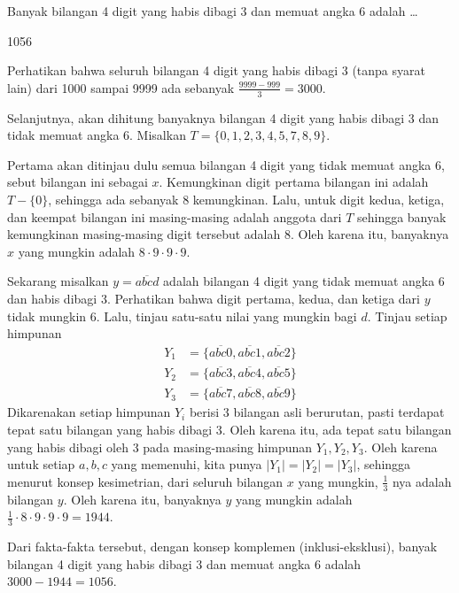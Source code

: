 \begin{soalbaru}
Banyak bilangan 4 digit yang habis dibagi 3 dan memuat angka 6 adalah \dots
\end{soalbaru}
\begin{jawaban}
1056
\end{jawaban}
\begin{solusi}
Perhatikan bahwa seluruh bilangan 4 digit yang habis dibagi 3 (tanpa syarat lain) dari 1000 sampai 9999 ada sebanyak $\frac{9999-999}{3}=3000$. 

Selanjutnya, akan dihitung banyaknya bilangan 4 digit yang habis dibagi 3 dan tidak memuat angka 6. Misalkan $T = \{0,1,2,3,4,5,7,8,9\}$. 

Pertama akan ditinjau dulu semua bilangan 4 digit yang tidak memuat angka 6, sebut bilangan ini sebagai $x$. Kemungkinan digit pertama bilangan ini adalah $T - \{0\}$, sehingga ada sebanyak $8$ kemungkinan. Lalu, untuk digit kedua, ketiga, dan keempat bilangan ini masing-masing adalah anggota dari $T$ sehingga banyak kemungkinan masing-masing digit tersebut adalah 8. Oleh karena itu, banyaknya $x$ yang mungkin adalah $8 \cdot 9 \cdot 9 \cdot 9$.

Sekarang misalkan $y = \overline{abcd}$ adalah bilangan 4 digit yang tidak memuat angka 6 dan habis dibagi 3. Perhatikan bahwa digit pertama, kedua, dan ketiga dari $y$ tidak mungkin 6. Lalu, tinjau satu-satu nilai yang mungkin bagi $d$. Tinjau setiap himpunan 
\begin{align*}
Y_1 &=\{\overline{abc0},\overline{abc1},\overline{abc2}\}\\ 
Y_2 &=\{\overline{abc3},\overline{abc4},\overline{abc5}\}\\
Y_3 &=\{\overline{abc7},\overline{abc8},\overline{abc9}\}
\end{align*}
Dikarenakan setiap himpunan $Y_i$ berisi 3 bilangan asli berurutan, pasti terdapat tepat satu bilangan yang habis dibagi 3. Oleh karena itu, ada tepat satu bilangan yang habis dibagi oleh 3 pada masing-masing himpunan $Y_1,Y_2,Y_3$. Oleh karena untuk setiap $a,b,c$ yang memenuhi, kita punya $|Y_1|=|Y_2|=|Y_3|$, sehingga menurut konsep kesimetrian, dari seluruh bilangan $x$ yang mungkin, $\frac{1}{3}$ nya adalah bilangan $y$. Oleh karena itu, banyaknya $y$ yang mungkin adalah $\frac{1}{3}\cdot 8 \cdot 9 \cdot 9 \cdot 9 = 1944$.

Dari fakta-fakta tersebut, dengan konsep komplemen (inklusi-eksklusi), banyak bilangan 4 digit yang habis dibagi 3 dan memuat angka 6 adalah $3000-1944 = \boxed{1056}$.
\end{solusi}

